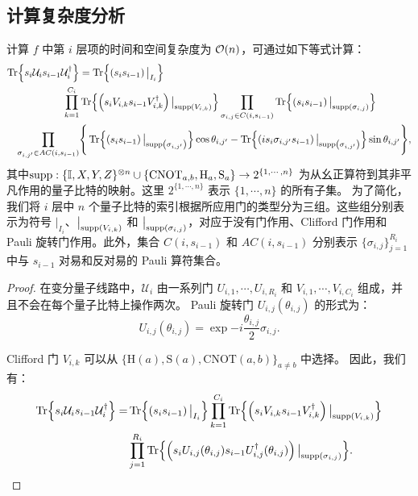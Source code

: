 \subsection{计算复杂度分析}
\begin{proposition}\label{prop:layer_terms}
    计算 $f$ 中第 $i$ 层项的时间和空间复杂度为 $\order{n}$，可通过如下等式计算：
    \begin{equation}\label{eq:i-layer_terms}
    \begin{aligned}
    \Tr{s_i\mathcal{U}_i s_{i-1}\mathcal{U}_i^\dagger}&=\Tr{\left(s_i s_{i-1}\right)\big|_{I_i}}\\
    \prod_{k=1}^{C_i}&\Tr{\left(s_iV_{i,k} s_{i-1}V_{i,k}^{\dagger}\right)\big|_{\text{supp} \left( V_{i,k} \right)}}\prod_{\sigma_{i,j}\in C(i,s_{i-1})}\Tr{\left(s_i s_{i-1}\right)\big|_{\text{supp} \left( \sigma_{i,j} \right)}}\\
    \prod_{\sigma_{i,j'}\in AC(i,s_{i-1})} &\Bigg\{ \Tr{\left(s_i s_{i-1}\right)\big|_{\text{supp} \left( \sigma_{i,j'} \right)}}\cos{\theta_{i,j'}}- \Tr{\left(is_i \sigma_{i,j'}s_{i-1}\right)\big|_{\text{supp} \left( \sigma_{i,j'} \right)}}\sin{\theta_{i,j'}}  \Bigg\},
    \end{aligned}
    \end{equation}
    其中$\text{supp}:\{\mathbb{I}, X, Y, Z\}^{\otimes n}\cup\{\mathrm{CNOT}_{a,b},\mathrm{H}_a,\mathrm{S}_a\}\rightarrow2^{\{1,\cdots, n\}}$ 为从幺正算符到其非平凡作用的量子比特的映射。这里 $2^{\{1,\cdots, n\}}$ 表示 $\{1,\cdots, n\}$ 的所有子集。
    为了简化，我们将 $i$ 层中 $n$ 个量子比特的索引根据所应用门的类型分为三组。这些组分别表示为符号 $\big|_{I_i}$、$\big|_{\text{supp} \left( V_{i,k} \right)}$ 和 $\big|_{\text{supp} \left( \sigma_{i,j} \right)}$，对应于没有门作用、Clifford 门作用和 Pauli 旋转门作用。此外，集合 $C(i,s_{i-1})$ 和 $AC(i,s_{i-1})$ 分别表示 $\{\sigma_{i,j}\}_{j=1}^{R_i}$ 中与 $s_{i-1}$ 对易和反对易的 Pauli 算符集合。
    
    \begin{proof}
    
    在变分量子线路中，$\mathcal{U}_i$ 由一系列门 $U_{i,1},\cdots,U_{i,R_i}$ 和 $V_{i,1},\cdots,V_{i,C_i}$ 组成，并且不会在每个量子比特上操作两次。
    Pauli 旋转门 $U_{i,j}(\theta_{i,j})$ 的形式为：
    \begin{equation}
      U_{i,j}(\theta_{i,j})=\exp{-i \frac{\theta_{i,j}}{2} \sigma_{i,j}}.
    \end{equation}
    
    Clifford 门 $V_{i,k}$ 可以从 $\{\mathrm{H}(a),\mathrm{S}(a),\mathrm{CNOT}(a,b) \}_ {a\neq b}$ 中选择。
    因此，我们有：
    \begin{equation}
      \begin{aligned}
        \Tr{s_i\mathcal{U}_i s_{i-1}\mathcal{U}_i^\dagger}=&\Tr{\left(s_i s_{i-1}\right)\big|_{I_i}}
        \prod_{k=1}^{C_i}\Tr{\left(s_iV_{i,k} s_{i-1}V_{i,k}^{\dagger}\right)\big|_{\text{supp} \left( V_{i,k} \right)}}\\
        &\prod_{j=1}^{R_i}\Tr{\left(s_i U_{i,j}(\theta_{i,j}) s_{i-1} U_{i,j}^\dagger(\theta_{i,j})\right) \big|_{\text{supp} \left( \sigma_{i,j} \right)}}.
      \end{aligned}
    \end{equation}
    

\end{proof}
\end{proposition}
